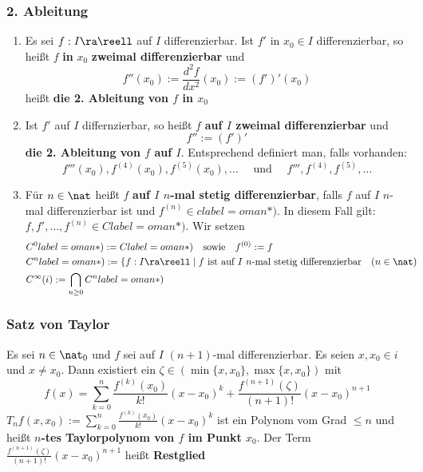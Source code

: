 \documentclass{kit}
\begin{document}
    \subsubsection{2. Ableitung}
      \begin{enumerate}
        \item Es sei $f:I\ra\reell$ auf $I$ differenzierbar. Ist $f'$ in $x_0\in I$ differenzierbar, so heißt $f$ \textbf{in} $x_0$ \textbf{zweimal differenzierbar} und
          $$f''(x_0):=\frac{d^2f}{dx^2}(x_0):=(f')'(x_0)$$
          heißt \textbf{die 2. Ableitung von $f$ in $x_0$}
        \item Ist $f'$ auf $I$ differnzierbar, so heißt $f$ \textbf{auf $I$ zweimal differenzierbar} und
          $$f'':=(f')'$$
          \textbf{die 2. Ableitung von $f$ auf $I$}. Entsprechend definiert man, falls vorhanden:
          $$f'''(x_0),f^{(4)}(x_0),f^{(5)}(x_0),\dots\quad\text{ und }\quad f''',f^{(4)},f^{(5)},\dots$$
        \item Für $n\in\nat$ heißt $f$ \textbf{auf $I$ $n$-mal stetig differenzierbar}, falls $f$ auf $I$ $n$-mal differenzierbar ist und $f^{(n)}\in clabel=
oman*)$. In diesem Fall gilt: $f,f',\dots,f^{(n)}\in Clabel=
oman*)$. Wir setzen
          $$\begin{aligned}
            & C^0label=
oman*):=Clabel=
oman*)\quad\text{sowie}\quad f^{(0)}:=f & \\
            & C^nlabel=
oman*):=\{f:I\ra\reell\mid f\text{ ist auf $I$ $n$-mal stetig differenzierbar}\quad(n\in\nat)\\
            & C^\infty(i):=\bigcap_{n\ge0}C^nlabel=
oman*)
            \end{aligned}$$
      \end{enumerate}
    \subsubsection{Satz von Taylor}
      Es sei $n\in\nat_0$ und $f$ sei auf $I$ $(n+1)$-mal differenzierbar. Es seien $x,x_0\in i$ und $x\neq x_0$. Dann existiert ein $\zeta\in(\min\{x,x_0\},\max\{x,x_0\})$ mit
      $$f(x)=\sum^n_{k=0}\frac{f^{(k)}(x_0)}{k!}(x-x_0)^k+\frac{f^{(n+1)}(\zeta)}{(n+1)!}(x-x_0)^{n+1}$$
      $T_nf(x,x_0):=\sum^n_{k=0}\frac{f^{(k)}(x_0)}{k!}(x-x_0)^k$ ist ein Polynom vom Grad $\le n$ und heißt \textbf{$n$-tes Taylorpolynom von $f$ im Punkt $x_0$}. Der Term $\frac{f^{(n+1)}(\zeta)}{(n+1)!}(x-x_0)^{n+1}$ heißt \textbf{Restglied}
\end{document}
